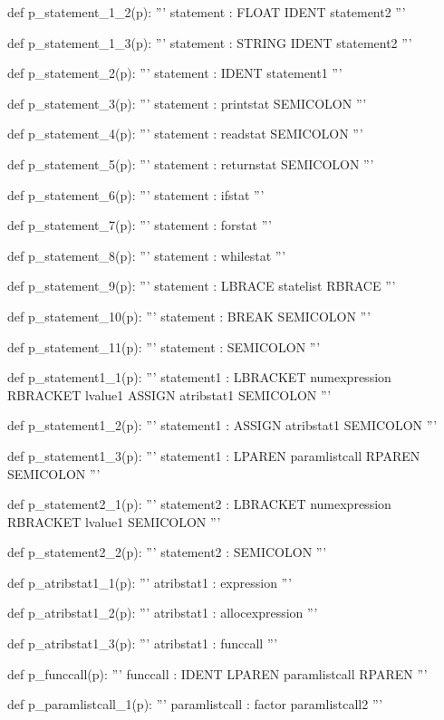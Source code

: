 \documentclass[
	12pt,				%
	openright,			%
	twoside,			%
	a4paper,			%
	english,			%
	french,				%
	spanish,			%
	brazil				%
	]{abntex2}
\begin{document}
\begin{python}
def p_statement_1_2(p):
    '''
    statement : FLOAT IDENT statement2
    '''

def p_statement_1_3(p):
    '''
    statement : STRING IDENT statement2
    '''

def p_statement_2(p):
    '''
    statement : IDENT statement1
    '''

def p_statement_3(p):
    '''
    statement : printstat SEMICOLON
    '''
 
def p_statement_4(p):
    '''
    statement : readstat SEMICOLON
    '''

def p_statement_5(p):
    '''
    statement : returnstat SEMICOLON
    '''

def p_statement_6(p):
    '''
    statement : ifstat
    '''

def p_statement_7(p):
    '''
    statement : forstat
    '''

def p_statement_8(p):
    '''
    statement : whilestat
    '''

def p_statement_9(p):
    '''
    statement : LBRACE statelist RBRACE
    '''

def p_statement_10(p):
    '''
    statement : BREAK SEMICOLON
    '''

def p_statement_11(p):
    '''
    statement : SEMICOLON
    '''

def p_statement1_1(p):
    '''
    statement1 : LBRACKET numexpression RBRACKET lvalue1 ASSIGN atribstat1 SEMICOLON
    '''

def p_statement1_2(p):
    '''
    statement1 : ASSIGN atribstat1 SEMICOLON
    '''

def p_statement1_3(p):
    '''
    statement1 : LPAREN paramlistcall RPAREN SEMICOLON
    '''

def p_statement2_1(p):
    '''
    statement2 : LBRACKET numexpression RBRACKET lvalue1 SEMICOLON
    '''

def p_statement2_2(p):
    '''
    statement2 : SEMICOLON
    '''

def p_atribstat1_1(p):
    '''
    atribstat1 : expression
    '''

def p_atribstat1_2(p):
    '''
    atribstat1 : allocexpression
    '''

def p_atribstat1_3(p):
    '''
    atribstat1 : funccall
    '''

def p_funccall(p):
    '''
    funccall : IDENT LPAREN paramlistcall RPAREN
    '''

def p_paramlistcall_1(p):
    '''
    paramlistcall : factor paramlistcall2
    '''


\end{python}
\end{document}
